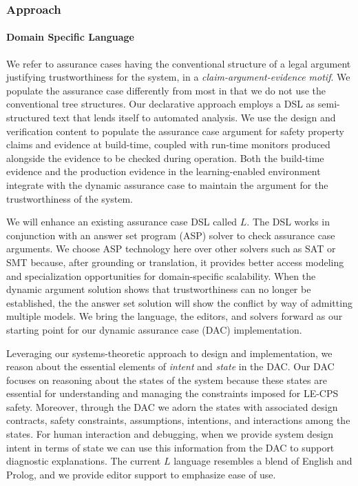 \subsubsection{Approach}

\paragraph{Domain Specific Language}

We refer to assurance cases having the conventional structure of a legal argument justifying trustworthiness for the system, in a {\em claim-argument-evidence motif}.  We populate the assurance case differently from most in that we do not use the conventional tree structures.  
Our declarative approach employs a DSL as semi-structured text that lends itself to automated analysis.  
We use the design and verification content to populate the assurance case argument for safety property claims and evidence at build-time, coupled with run-time monitors produced alongside the evidence to be checked during operation.  Both the build-time evidence and the production evidence in the learning-enabled environment integrate with the dynamic assurance case to maintain the argument for the trustworthiness of the system.  

We will enhance an existing assurance case DSL called $L$. The DSL works in conjunction with an answer set program (ASP) solver to check assurance case arguments.  We choose ASP technology here over other solvers such as SAT or SMT because, after grounding or translation, it provides better access modeling and specialization opportunities for domain-specific scalability.  When the dynamic argument solution shows that trustworthiness can no longer be established, the the answer set solution will show the conflict by way of admitting multiple models.   We bring the language, the editors, and solvers forward as our starting point for our dynamic assurance case (DAC) implementation.

Leveraging our systems-theoretic approach to design and implementation, we reason about the essential elements of {\em intent\/} and {\em state\/} in the DAC.  Our DAC focuses on reasoning about the states of the system because these states are essential for understanding and managing the constraints imposed for LE-CPS safety.  Moreover, through the DAC we adorn the states with associated design contracts, safety constraints, assumptions, intentions, and interactions among the states.  
For human interaction and debugging, when we provide system design intent in terms of state we can use this information from the DAC to support diagnostic explanations.  The current $L$ language resembles a blend of English and Prolog, and we provide editor support to emphasize ease of use.  



